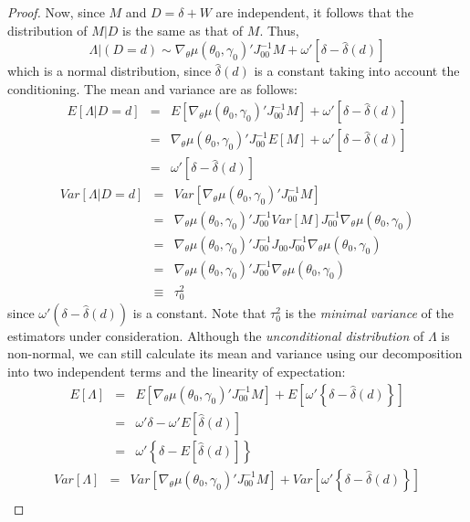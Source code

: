 \begin{proof}
Now, since $M$ and $D = \delta + W$ are independent, it follows that the distribution of $M|D$ is the same as that of $M$. Thus, 
	$$
	\Lambda|(D=d) \sim  \nabla_\theta \mu(\theta_0,\gamma_0)' J_{00}^{-1} M + \omega' \left[\delta - \hat{\delta}(d) \right] 
$$
which is a normal distribution, since $\hat{\delta}(d)$ is a constant taking into account the conditioning. The mean and variance are as follows:
	\begin{eqnarray*}
	E\left[\Lambda  | D= d\right] &=& E\left[\nabla_\theta\mu(\theta_0, \gamma_0)' J_{00}^{-1}M\right] + \omega' \left[\delta - \hat{\delta}(d) \right] \\
				&=& \nabla_\theta\mu(\theta_0, \gamma_0)' J_{00}^{-1}E\left[M\right] + \omega' \left[\delta - \hat{\delta}(d) \right] \\
			&=& \omega' \left[\delta - \hat{\delta}(d) \right] 	
\end{eqnarray*}
	\begin{eqnarray*}
	Var\left[\Lambda  | D= d\right] &=& Var\left[\nabla_\theta\mu(\theta_0, \gamma_0)' J_{00}^{-1}M\right]\\
				&=& \nabla_\theta\mu(\theta_0, \gamma_0)' J_{00}^{-1}Var[M]J_{00}^{-1}\nabla_\theta\mu(\theta_0, \gamma_0)\\
				&=& \nabla_\theta\mu(\theta_0, \gamma_0)' J_{00}^{-1}J_{00}J_{00}^{-1}\nabla_\theta\mu(\theta_0, \gamma_0)\\
				&=& \nabla_\theta\mu(\theta_0, \gamma_0)' J_{00}^{-1}\nabla_\theta\mu(\theta_0, \gamma_0)\\
	&\equiv& \tau_0^2
\end{eqnarray*}
since $\omega'(\delta - \hat{\delta}(d) )$ is a constant. Note that $\tau^2_0$ is the \emph{minimal variance} of the estimators under consideration. Although the \emph{unconditional distribution} of $\Lambda$ is non-normal, we can still calculate its mean and variance using our decomposition into two independent terms and the linearity of expectation:
	\begin{eqnarray*}
	E\left[\Lambda\right] &=& E\left[\nabla_\theta\mu(\theta_0, \gamma_0)' J_{00}^{-1}M\right] + E\left[\omega' \left\{\delta - \hat{\delta}(d) \right\}\right] \\
			&=& \omega' \delta  -\omega'  E\left[\hat{\delta}(d)\right] \\	
			&=& \omega' \left\{\delta  - E\left[\hat{\delta}(d)\right]\right\}
\end{eqnarray*}
	\begin{eqnarray*}
	Var\left[\Lambda\right] &=& Var\left[\nabla_\theta\mu(\theta_0, \gamma_0)' J_{00}^{-1}M\right] + Var\left[\omega' \left\{\delta - \hat{\delta}(d) \right\}\right]\\

\end{eqnarray*}
\end{proof}
